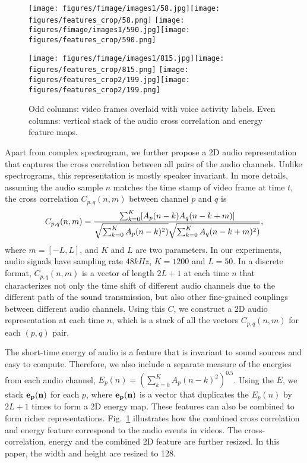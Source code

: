 \documentclass[10pt,twocolumn,letterpaper]{article}
\begin{document}
\begin{figure}[tb]
\centering
\texttt{[image: figures/fimage/images1/58.jpg]}\texttt{[image: figures/features\_crop/58.png]}\hspace{0.02em}
\texttt{[image: figures/fimage/images1/590.jpg]}\texttt{[image: figures/features\_crop/590.png]}

\vspace{0.15em}

\texttt{[image: figures/fimage/images1/815.jpg]}\texttt{[image: figures/features\_crop/815.png]}\hspace{0.02em}
\texttt{[image: figures/features\_crop2/199.jpg]}\texttt{[image: figures/features\_crop2/199.png]}\vspace{-5pt}
\caption{Odd columns: video frames overlaid with voice activity labels. 
Even columns: vertical stack of the
	audio cross correlation and energy feature maps.}
\vspace{-20pt}	
\label{fig:feature}
\end{figure}

Apart from complex spectrogram,  
we further propose a 2D audio representation that captures the cross correlation between all pairs of the 
audio channels. 
Unlike spectrograms, this representation is mostly speaker invariant.
In more details, assuming the audio sample $n$ matches the time stamp of video frame at time $t$, the cross
correlation $C_{p,q}(n,m)$ between channel $p$ and $q$ is
\vspace{-3pt}
\small
\[
	C_{p,q}(n, m) = \frac{\sum_{k=0}^K [A_p(n - k) A_q(n - k + m)]}{\sqrt{\sum_{k=0}^K A_p(n - k)^2)}\sqrt{\sum_{k=0}^K A_q(n - k + m)^2)}}, 
	\vspace{-3pt}
\]
\normalsize
where $m=[-L,L]$, and $K$ and $L$ are two parameters. 
In our experiments, audio signals have sampling rate $48kHz$, $K=1200 $ and $L=50$. In a discrete format, $C_{p,q}(n,m)$ is a vector of length $2L+1$ at each time $n$ 
that characterizes not only the time shift of different audio channels due to the different path of the sound
transmission, but also other fine-grained couplings between different audio channels.
Using this $C$, we construct a 2D audio representation at each time $n$, 
which is a stack of all the vectors $C_{p,q}(n,m)$ for each $(p,q)$ pair.

The short-time energy of audio is a feature that is invariant to sound sources 
and easy to compute.
Therefore, we also include a separate measure of the energies from each audio channel, 
\small $E_p(n) = (\sum_{k=0}^K A_p(n - k)^2)^{0.5}$. \normalsize
Using the $E$, we stack $\bf{e}_p(n)$ for each $p$, where $\bf{e}_p(n)$ is 
a vector that duplicates the $E_p(n)$ by $2L+1$ times to form a 2D energy map.
These features can also be combined to form richer representations. 
Fig.~\ref{fig:feature} illustrates how the combined cross correlation and energy feature correspond to 
the audio events in videos. 
The cross-correlation, energy and the combined 2D feature are further
resized. In this paper, the width and height are resized to 128. 
\end{document}
